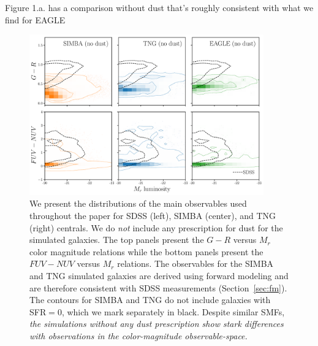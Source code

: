 \cite{trayford2015} Figure 1.a. has a comparison without dust that's roughly
consistent with what we find for EAGLE



\begin{figure}
\begin{center}
\includegraphics[width=0.9\textwidth]{figs/observables.pdf} 
    \caption{We present the distributions of the main observables used
    throughout the paper for SDSS (left), SIMBA (center), and TNG (right)
    centrals. We do {\em not} include any prescription for dust for the
    simulated galaxies. The top panels
    present the $G-R$ versus $M_r$ color magnitude relations while the bottom
    panels present the $FUV-NUV$ versus $M_r$ relations. The observables for
    the SIMBA and TNG simulated galaxies are derived using forward modeling and
    are therefore consistent with SDSS measurements (Section~\ref{sec:fm}). The
    contours for SIMBA and TNG do not include galaxies with SFR$=0$, which we
    mark separately in black. Despite similar SMFs,  {\em the simulations
    without any dust prescription show stark differences with observations in
    the color-magnitude observable-space.} 
    }
\label{fig:obs}
\end{center}
\end{figure}
